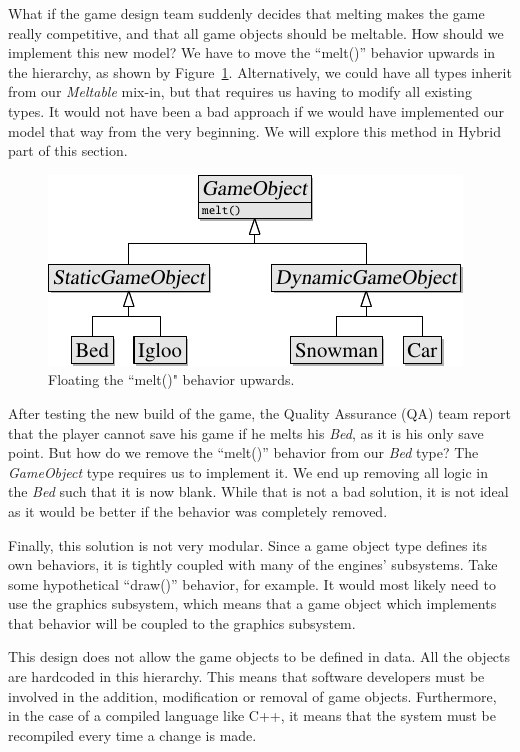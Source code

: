 \documentclass[
    phd,
    electronic,
    letterpaper,
    simplechapterheading,
    openany,
    parttop,
    lof,
]{byumsphd}
\begin{document}
What if the game design team suddenly decides that melting makes the game really competitive, and that all game objects should be meltable. How should we implement this new model? We have to move the ``melt()'' behavior upwards in the hierarchy, as shown by Figure~\ref{fig:hierarchy:4}. Alternatively, we could have all types inherit from our \textit{Meltable} mix-in, but that requires us having to modify all existing types. It would not have been a bad approach if we would have implemented our model that way from the very beginning. We will explore this method in Hybrid part of this section.

\begin{figure}[H]
\bigskip
\centering
\includegraphics[width=0.8\linewidth]{hierarchy-uml-diagrams/hierarchy-4.pdf}
\caption{Floating the ``melt()" behavior upwards.}
\label{fig:hierarchy:4}
\end{figure}

After testing the new build of the game, the Quality Assurance (QA) team report that the player cannot save his game if he melts his \textit{Bed}, as it is his only save point. But how do we remove the ``melt()'' behavior from our \textit{Bed} type? The \textit{GameObject} type requires us to implement it. We end up removing all logic in the \textit{Bed} such that it is now blank. While that is not a bad solution, it is not ideal as it would be better if the behavior was completely removed.

Finally, this solution is not very modular. Since a game object type defines its own behaviors, it is tightly coupled with many of the engines' subsystems. Take some hypothetical ``draw()'' behavior, for example. It would most likely need to use the graphics subsystem, which means that a game object which implements that behavior will be coupled to the graphics subsystem.

This design does not allow the game objects to be defined in data. All the objects are hardcoded in this hierarchy. This means that software developers must be involved in the addition, modification or removal of game objects. Furthermore, in the case of a compiled language like C++, it means that the system must be recompiled every time a change is made.
\end{document}
